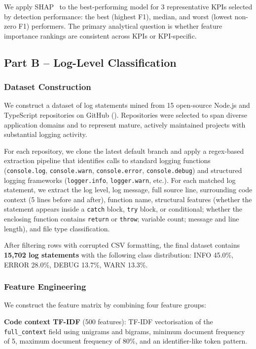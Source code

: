 \documentclass[10pt,twocolumn]{article}
\begin{document}
We apply SHAP~\cite{lundberg2017} to the best-performing model for 3 representative KPIs selected by detection performance: the best (highest F1), median, and worst (lowest non-zero F1) performers. The primary analytical question is whether feature importance rankings are consistent across KPIs or KPI-specific.

\subsection{Part B -- Log-Level Classification}

\subsubsection{Dataset Construction}

We construct a dataset of log statements mined from 15 open-source Node.js and TypeScript repositories on GitHub (). Repositories were selected to span diverse application domains and to represent mature, actively maintained projects with substantial logging activity.

For each repository, we clone the latest default branch and apply a regex-based extraction pipeline that identifies calls to standard logging functions (\texttt{console.log}, \texttt{console.warn}, \texttt{console.error}, \texttt{console.debug}) and structured logging frameworks (\texttt{logger.info}, \texttt{logger.warn}, etc.). For each matched log statement, we extract the log level, log message, full source line, surrounding code context (5 lines before and after), function name, structural features (whether the statement appears inside a \texttt{catch} block, \texttt{try} block, or conditional; whether the enclosing function contains \texttt{return} or \texttt{throw}; variable count; message and line length), and file type classification.

After filtering rows with corrupted CSV formatting, the final dataset contains \textbf{15,702 log statements} with the following class distribution: INFO 45.0\%, ERROR 28.0\%, DEBUG 13.7\%, WARN 13.3\%.

\subsubsection{Feature Engineering}

We construct the feature matrix by combining four feature groups:

\textbf{Code context TF-IDF} (500 features): TF-IDF vectorisation of the \texttt{full\_context} field using unigrams and bigrams, minimum document frequency of 5, maximum document frequency of 80\%, and an identifier-like token pattern.
\end{document}
